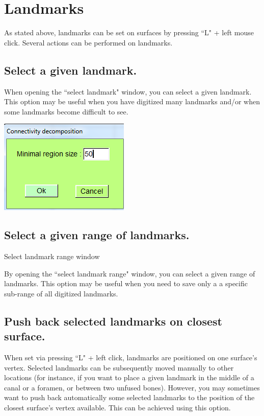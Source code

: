 
\chapter{Landmarks}
\minitoc 


As stated above, landmarks can be set on surfaces by pressing ``L" + left mouse click. Several actions
can be performed on landmarks.

\section{Select a given landmark.}


\noindent
\begin{minipage}{0.5\textwidth}
When opening the ``select landmark" window, you can
select a given landmark. This option may be useful when
you have digitized many landmarks and/or when some
landmarks become difficult to see.
\end{minipage}    
\begin{minipage}{0.5\textwidth}\centering
  \includegraphics[scale=0.5]{images/Edit_selected_objects/03_Decompose.png}
 \end{minipage} 
\noindent

\section{Select a given range of landmarks.}

Select landmark range window

By opening the ``select landmark range" window, you can
select a given range of landmarks. This option may be useful
when you need to save only a a specific sub-range of all
digitized landmarks.

\section{Push back selected landmarks on closest surface.}
When set via pressing ``L" + left click, landmarks are positioned on one surface’s vertex. Selected
landmarks can be subsequently moved manually to other locations (for instance, if you want to place
a given landmark in the middle of a canal or a foramen, or between two unfused bones). However,
you may sometimes want to push back automatically some selected landmarks to the position of the
closest surface’s vertex available. This can be achieved using this option.


